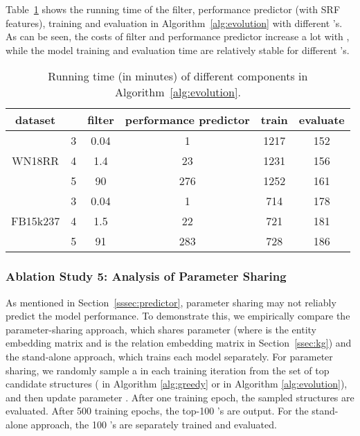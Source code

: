 \documentclass[10pt,journal,compsoc]{IEEEtran}
\begin{document}
Table~\ref{tab:Ktime} shows
the running time of the
filter, performance predictor (with SRF features),
training and evaluation in Algorithm~\ref{alg:evolution}
with different 's.
As can be seen,
the costs of filter and performance predictor increase a lot with ,
while the model training and evaluation time are relatively stable for different 's.

\begin{table}[ht]
	\centering
	\vspace{-5px}
	\caption{Running time (in minutes) of different components in Algorithm~\ref{alg:evolution}.}
	\label{tab:Ktime}
	\vspace{-10px}
	\setlength\tabcolsep{4pt}
	\begin{tabular}{c|c|cccc}
		\toprule
		dataset &    &  filter  & performance predictor  & train  & evaluate \\
		\midrule
		\multirow{3}{*}{WN18RR} & 3  & 0.04 & 1 & 1217  & 152 \\
		& 4  & 1.4 &  23 &  1231 & 156 \\
		& 5  & 90 & 276 & 1252 & 161 \\  
		\midrule
		\multirow{3}{*}{FB15k237} & 3  & 0.04& 1 & 714 & 178  \\
		& 4  & 1.5 & 22 & 721 & 181 \\
		& 5  & 91 & 283 &  728 & 186 \\  
		\bottomrule
	\end{tabular}
\vspace{-10px}
\end{table}


\subsubsection{Ablation Study 5: Analysis of Parameter Sharing}
\label{sec:exp:ps}

As mentioned in 
Section~\ref{sssec:predictor},
parameter sharing may not reliably predict the model performance.
To demonstrate this,
we empirically compare the parameter-sharing approach, which 
shares parameter  
(where  is the entity embedding matrix and 
 is the
relation embedding matrix
in Section~\ref{ssec:kg})
and the stand-alone approach, which trains each model separately.
For parameter sharing,
we randomly sample a  
in each training  iteration
from the set of top candidate structures 
( in Algorithm \ref{alg:greedy} or  in Algorithm \ref{alg:evolution}),
and then update parameter .
After one training epoch,
the sampled structures 
are evaluated. 
After 500 training epochs,
the top-100 's 
are output.
For the stand-alone approach,
the 100 's 
are separately trained and evaluated.
\end{document}
